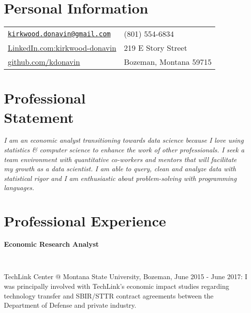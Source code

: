 \documentclass[resmargin, line, pifont ,palatino,courier]{res}
\newcommand{\tab}[1][1cm]{\hspace*{#1}}
\newcommand{\subtext}[1]{\tighter ~ \newline \tab[0.5cm] \parbox{\fullwidth}{#1}}
\newcommand{\halfwidth}{5.75cm}
\newcommand{\fullwidth}{11.5cm}
\newcommand{\tight}{\vspace{-0.5cm}}
\newcommand{\tighter}{\vspace{-0.75cm}}
\begin{document}

\begin{resume}
\small
\section{\sc Personal Information}

\vspace{.05in}
\begin{tabular}{@{}p{\halfwidth}p{\halfwidth}} %
\href{mailto:kirkwood.donavin@gmail.com}{\texttt{kirkwood.donavin@gmail.com}} & (801) 554-6834 \\
\href{https://www.linkedin.com/in/kirkwood-donavin-22a5831b}{LinkedIn.com:kirkwood-donavin} & 219 E Story Street\\
\href{https://}{github.com/kdonavin} & Bozeman, Montana 59715\\
\end{tabular}

\section{\sc Professional \\ Statement}

\emph{I am an economic analyst transitioning towards data science because I love using statistics \& computer science to enhance the work of other professionals. I seek a team environment with quantitative co-workers and mentors that will facilitate my growth as a data scientist. I am able to query, clean and analyze data with statistical rigor and I am enthusiastic about problem-solving with programming languages.} 

\section{\sc Professional Experience} %


\textbf{Economic Research Analyst}

	\subtext{TechLink Center @ Montana State University, Bozeman, June 2015 - June 2017: I was principally involved with TechLink's economic impact studies regarding technology transfer and SBIR/STTR contract agreements between the Department of Defense and private industry.}
	
	\tight
	

\end{resume}
\end{document}
